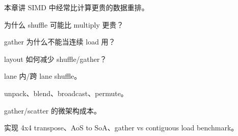 {本章讲 SIMD 中经常比计算更贵的数据重排。}
{\item 为什么 shuffle 可能比 multiply 更贵？
\item gather 为什么不能当连续 load 用？
\item layout 如何减少 shuffle/gather？}
{\item lane 内/跨 lane shuffle。
\item unpack、blend、broadcast、permute。
\item gather/scatter 的微架构成本。}
{实现 4x4 transpose、AoS to SoA、gather vs contiguous load benchmark。}
